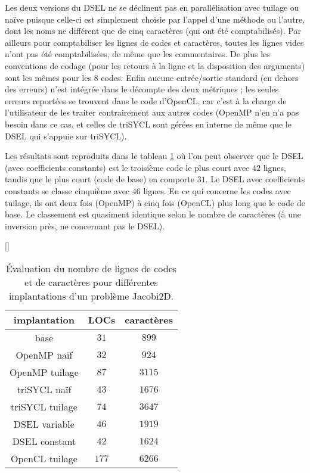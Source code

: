 Les deux versions du DSEL ne se déclinent pas en parallélisation avec tuilage ou naïve puisque celle-ci est simplement choisie par l'appel d'une méthode ou l'autre, dont les noms ne différent que de cinq caractères (qui ont été comptabilisés). Par ailleurs pour comptabiliser les lignes de codes et caractères, toutes les lignes vides n'ont pas été comptabilisées, de même que les commentaires. De plus les conventions de codage (pour les retours à la ligne et la disposition des arguments) sont les mêmes pour les $8$ codes. Enfin aucune entrée/sortie standard (en dehors des erreurs) n'est intégrée dans le décompte des deux métriques ; les seules erreurs reportées se trouvent dans le code d'\textsf{OpenCL}, car c'est à la charge de l'utilisateur de les traiter contrairement aux autres codes (\textsf{OpenMP} n'en n'a pas besoin dans ce cas, et celles de \textsf{triSYCL} sont gérées en interne de même que le DSEL qui s'appuie sur \textsf{triSYCL}).

Les résultats sont reproduits dans le tableau \ref{tab:eval_qual} où l'on peut observer que le DSEL (avec coefficients constants) est le troisième code le plus court avec $42$ lignes, tandis que le plus court (code de base) en comporte $31$. Le DSEL avec coefficients constants se classe cinquième avec $46$ lignes. En ce qui concerne les codes avec tuilage, ils ont deux fois (\textsf{OpenMP}) à cinq fois (\textsf{OpenCL}) plus long que le code de base. Le classement est quasiment identique selon le nombre de caractères (à une inversion près, ne concernant pas le DSEL).

\begin{table}
[\FBwidth]
{
\caption{Évaluation du nombre de lignes de codes et de caractères pour différentes implantations d'un problème Jacobi2D.}
\label{tab:eval_qual}
}
{
\begin{tabular}{||c||c|c||}
\hline
implantation & LOCs & caractères \\
\hline
\hline
base & $31$ & $899$ \\
\hline
OpenMP naïf & $32$ & $924$ \\
\hline
OpenMP tuilage & $87$ & $3115$ \\
\hline
triSYCL naïf & $43$ & $1676$ \\
\hline
triSYCL tuilage & $74$ & $3647$ \\
\hline
DSEL variable & $46$ & $1919$ \\
\hline
DSEL constant & $42$ & $1624$ \\
\hline
OpenCL tuilage & $177$ & $6266$ \\
\hline
\end{tabular}
}
\end{table}

